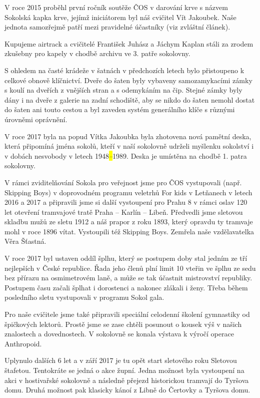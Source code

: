 V roce 2015 proběhl první ročník soutěže ČOS v darování krve s názvem
Sokolská kapka krve, jejímž iniciátorem byl náš cvičitel Vít Jakoubek.
Naše jednota samozřejmě patří mezi pravidelné účastníky (viz zvláštní
článek).

Kupujeme airtrack a cvičitelé František Juhász a Jáchym Kaplan stáli za
zrodem zkušebny pro kapely v chodbě archivu ve 3. patře sokolovny.

S ohledem na časté krádeže v šatnách v předchozích letech bylo
přistoupeno k celkové obnově klíčnictví. Dveře do šaten byly vybaveny
samozamykacími zámky s koulí na dveřích z vnějších stran a s odemykáním
na čip. Stejné zámky byly dány i na dveře z galerie na zadní schodiště,
aby se nikdo do šaten nemohl dostat do šaten ani touto cestou a byl
zaveden systém generálního klíče s různými úrovněmi oprávnění.

V roce 2017 byla na popud Vítka Jakoubka byla zhotovena nová pamětní
deska, která připomíná jména sokolů, kteří v naší sokolovně udrželi
myšlenku sokolství i v dobách nesvobody v letech 1948\emph{\hl{--}}1989.
Deska je umístěna na chodbě 1. patra sokolovny.

V rámci zviditelňování Sokola pro veřejnost jsme pro ČOS vystupovali
(např. Skipping Boys) v doprovodném programu veletrhů For kids v
Letňanech v letech 2016 a 2017 a připravili jsme si další vystoupení pro
Prahu 8 v rámci oslav 120 let otevření tramvajové tratě Praha -- Karlín
-- Libeň. Předvedli jsme sletovou skladbu mužů ze sletu 1912 a náš
prapor z roku 1893, který opravdu ty tramvaje mohl v roce 1896 vítat.
Vystoupili též Skipping Boys. Zemřela naše vzdělavatelka Věra Šťastná.

V roce 2017 byl ustaven oddíl šplhu, který se postupem doby stal jedním
ze tří nejlepších v České republice. Řada jeho členů plní limit 10
vteřin ve šplhu ze sedu bez přírazu na osmimetrovém laně, a může se tak
účastnit mistrovství republiky. Postupem času začali šplhat i dorostenci
a nakonec zlákali i ženy. Třeba během posledního sletu vystupovali v
programu Sokol gala.

Pro naše cvičitele jsme také připravili speciální celodenní školení
gymnastiky od špičkových lektorů. Prostě jsme se zase chtěli posunout o
kousek výš v našich znalostech a dovednostech. V sokolovně se konala
výstava k výročí operace Anthropoid.

Uplynulo dalších 6 let a v září 2017 je tu opět start sletového roku
Sletovou štafetou. Tentokráte se jedná o akce župní. Jedna možnost byla
vystoupení na akci v hostivařské sokolovně a následně přejezd
historickou tramvají do Tyršova domu. Druhá možnost pak klasicky kánoí z
Libně do Čertovky a Tyršova domu.

